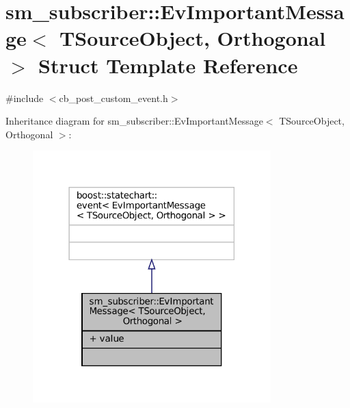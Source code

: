 \hypertarget{structsm__subscriber_1_1EvImportantMessage}{}\section{sm\+\_\+subscriber\+:\+:Ev\+Important\+Message$<$ T\+Source\+Object, Orthogonal $>$ Struct Template Reference}
\label{structsm__subscriber_1_1EvImportantMessage}


{\ttfamily \#include $<$cb\+\_\+post\+\_\+custom\+\_\+event.\+h$>$}



Inheritance diagram for sm\+\_\+subscriber\+:\+:Ev\+Important\+Message$<$ T\+Source\+Object, Orthogonal $>$\+:
\nopagebreak
\begin{figure}[H]
\begin{center}
\leavevmode
\includegraphics[width=261pt]{structsm__subscriber_1_1EvImportantMessage__inherit__graph}
\end{center}
\end{figure}


